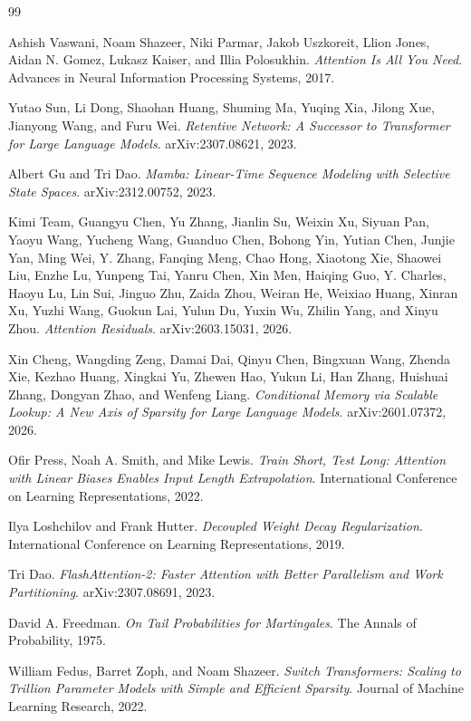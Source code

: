 \documentclass[11pt]{article}
\begin{document}
\begin{thebibliography}{99}

Ashish Vaswani, Noam Shazeer, Niki Parmar, Jakob Uszkoreit, Llion Jones, Aidan N. Gomez, Lukasz Kaiser, and Illia Polosukhin.
\textit{Attention Is All You Need}.
Advances in Neural Information Processing Systems, 2017.

Yutao Sun, Li Dong, Shaohan Huang, Shuming Ma, Yuqing Xia, Jilong Xue, Jianyong Wang, and Furu Wei.
\textit{Retentive Network: A Successor to Transformer for Large Language Models}.
arXiv:2307.08621, 2023.

Albert Gu and Tri Dao.
\textit{Mamba: Linear-Time Sequence Modeling with Selective State Spaces}.
arXiv:2312.00752, 2023.

Kimi Team, Guangyu Chen, Yu Zhang, Jianlin Su, Weixin Xu, Siyuan Pan, Yaoyu Wang, Yucheng Wang, Guanduo Chen, Bohong Yin, Yutian Chen, Junjie Yan, Ming Wei, Y. Zhang, Fanqing Meng, Chao Hong, Xiaotong Xie, Shaowei Liu, Enzhe Lu, Yunpeng Tai, Yanru Chen, Xin Men, Haiqing Guo, Y. Charles, Haoyu Lu, Lin Sui, Jinguo Zhu, Zaida Zhou, Weiran He, Weixiao Huang, Xinran Xu, Yuzhi Wang, Guokun Lai, Yulun Du, Yuxin Wu, Zhilin Yang, and Xinyu Zhou.
\textit{Attention Residuals}.
arXiv:2603.15031, 2026.

Xin Cheng, Wangding Zeng, Damai Dai, Qinyu Chen, Bingxuan Wang, Zhenda Xie, Kezhao Huang, Xingkai Yu, Zhewen Hao, Yukun Li, Han Zhang, Huishuai Zhang, Dongyan Zhao, and Wenfeng Liang.
\textit{Conditional Memory via Scalable Lookup: A New Axis of Sparsity for Large Language Models}.
arXiv:2601.07372, 2026.

Ofir Press, Noah A. Smith, and Mike Lewis.
\textit{Train Short, Test Long: Attention with Linear Biases Enables Input Length Extrapolation}.
International Conference on Learning Representations, 2022.

Ilya Loshchilov and Frank Hutter.
\textit{Decoupled Weight Decay Regularization}.
International Conference on Learning Representations, 2019.

Tri Dao.
\textit{FlashAttention-2: Faster Attention with Better Parallelism and Work Partitioning}.
arXiv:2307.08691, 2023.

David A. Freedman.
\textit{On Tail Probabilities for Martingales}.
The Annals of Probability, 1975.

William Fedus, Barret Zoph, and Noam Shazeer.
\textit{Switch Transformers: Scaling to Trillion Parameter Models with Simple and Efficient Sparsity}.
Journal of Machine Learning Research, 2022.


\end{thebibliography}
\end{document}
